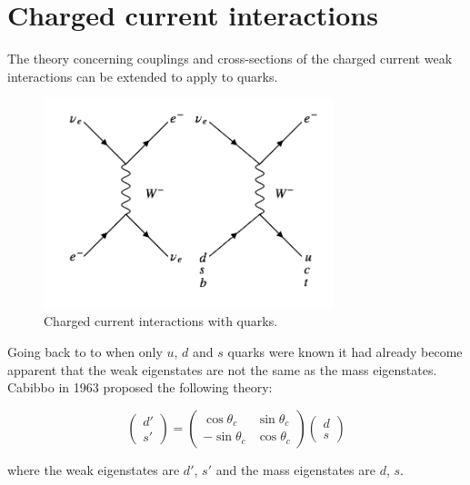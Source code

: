 \section{Charged current interactions}

The theory concerning couplings and cross-sections of the charged current weak interactions can be extended to apply to quarks.

\begin{figure}[!htb]
  \begin{center}
    \includegraphics[width=0.75\textwidth]{images/web_feynman/image_48.png}
    \caption[Charged current interactions with quarks]{Charged current interactions with quarks.}
    \label{fig:ch12_chargedCurrentQuarks}
  \end{center}
\end{figure}

Going back to to when only $u$, $d$ and $s$ quarks were known it had already become apparent that the weak eigenstates are not the same as the mass eigenstates.  Cabibbo in 1963 proposed the following theory:

\[
  \left(
  \begin{array}{c}
    d' \\
    s'
  \end{array}
  \right)
  =
  \left(
  \begin{array}{cc}
    \cos\theta_c  & \sin\theta_c \\
    -\sin\theta_c & \cos\theta_c
  \end{array}
  \right)
  \left(
  \begin{array}{c}
    d \\
    s
  \end{array}
  \right)
\]

where the weak eigenstates are $d'$, $s'$ and the mass eigenstates are $d$, $s$.

